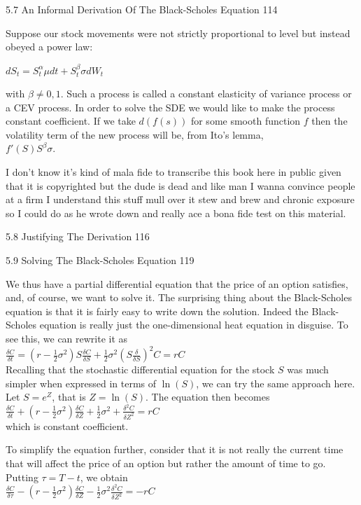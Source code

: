 5.7 An Informal Derivation Of The Black-Scholes Equation 114

Suppose our stock movements were not strictly proportional to level but instead obeyed a power law:

$dS_t = S_t^{\alpha} \mu dt + S_t^{\beta} \sigma dW_t$

with $\beta \neq 0,1$. Such a process is called a constant elasticity of variance process or a CEV process. In order to solve the SDE we would like to make the process constant coefficient. If we take $d(f(s))$ for some smooth function $f$ then the volatility term of the new process will be, from Ito's lemma, \\
$f'(S) S^{\beta} \sigma$.

I don't know it's kind of mala fide to transcribe this book here in public given that it is copyrighted but the dude is dead and like man I wanna convince people at a firm I understand this stuff mull over it stew and brew and chronic exposure so I could do as he wrote down and really ace a bona fide test on this material.

5.8 Justifying The Derivation 116



5.9 Solving The Black-Scholes Equation 119

We thus have a partial differential equation that the price of an option satisfies, and, of course, we want to solve it. The surprising thing about the Black-Scholes equation is that it is fairly easy to write down the solution. Indeed the Black-Scholes equation is really just the one-dimensional heat equation in disguise. To see this, we can rewrite it as \\
$\frac{\delta C}{\delta t} = \left( r-\frac{1}{2} \sigma^2 \right) S \frac{\delta C}{\delta S} + \frac{1}{2} \sigma^2 \left( S \frac{\delta}{\delta S} \right)^2 C = rC$ \\
Recalling that the stochastic differential equation for the stock $S$ was much simpler when expressed in terms of $\ln (S)$, we can try the same approach here. Let $S=e^Z$, that is $Z = \ln(S)$. The equation then becomes \\
$\frac{\delta C}{\delta t} + \left( r-\frac{1}{2} \sigma^2 \right) \frac{\delta C}{\delta Z} + \frac{1}{2} \sigma^2 +\frac{\delta^2 C}{\delta Z^2} = rC$ \\
which is constant coefficient.

To simplify the equation further, consider that it is not really the current time that will affect the price of an option but rather the amount of time to go. Putting $\tau = T-t$, we obtain \\
$\frac{\delta C}{\delta \tau} - \left( r-\frac{1}{2} \sigma^2 \right) \frac{\delta C}{\delta Z} - \frac{1}{2} \sigma^2 \frac{\delta^2 C}{\delta Z^2} = -rC$

